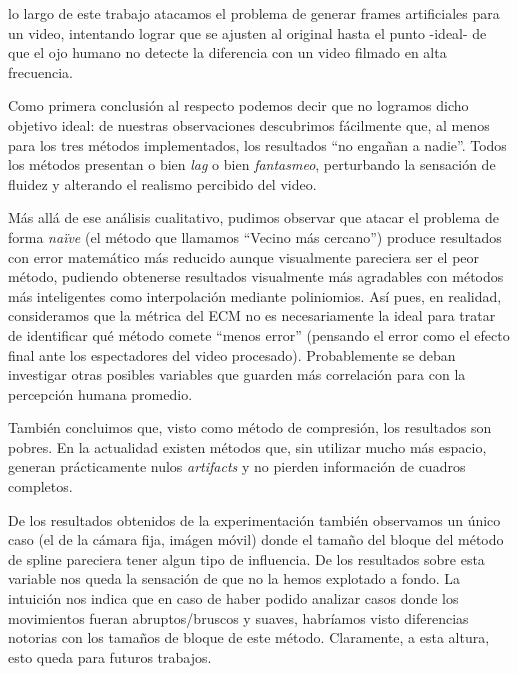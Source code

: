  lo largo de este trabajo atacamos el problema de generar
frames artificiales para un video, intentando lograr que se ajusten al original
hasta el punto -ideal- de que el ojo humano no detecte la diferencia con un
video filmado en alta frecuencia.

\par Como primera conclusión al respecto podemos decir que no logramos dicho
objetivo ideal: de nuestras observaciones descubrimos fácilmente que, al menos
para los tres métodos implementados, los resultados ``no engañan a nadie''.
Todos los métodos presentan o bien \emph{lag} o bien \emph{fantasmeo},
perturbando la sensación de fluidez y alterando el realismo percibido del
video.

\par Más allá de ese análisis cualitativo, pudimos observar que atacar el
problema de forma \emph{naïve} (el método que llamamos ``Vecino más cercano'')
produce resultados con error matemático más reducido aunque visualmente
pareciera ser el peor método, pudiendo obtenerse resultados visualmente más
agradables con métodos más inteligentes como interpolación mediante
poliniomios. As\'i pues, en realidad, consideramos que la m\'etrica del ECM
no es necesariamente la ideal para tratar de identificar qué m\'etodo comete
``menos error'' (pensando el error como el efecto final ante los espectadores
del video procesado). Probablemente se deban investigar otras posibles variables
que guarden más correlaci\'on para con la percepci\'on humana promedio.

\par También concluimos que, visto como método de compresión, los resultados
son pobres. En la actualidad existen métodos que, sin utilizar mucho más
espacio, generan prácticamente nulos \emph{artifacts} y no pierden información
de cuadros completos.

\par De los resultados obtenidos de la experimentaci\'on tambi\'en observamos
un \'unico caso (el de la c\'amara fija, im\'agen m\'ovil) donde el tama\~no
del bloque del m\'etodo de spline pareciera tener algun tipo de influencia.
De los resultados sobre esta variable nos queda la sensaci\'on de que no
la hemos explotado a fondo. La intuici\'on nos indica que en caso de haber
podido analizar casos donde los movimientos fueran abruptos/bruscos y suaves,
habr\'iamos visto diferencias notorias con los tama\~nos de bloque de este
m\'etodo. Claramente, a esta altura, esto queda para futuros trabajos.

